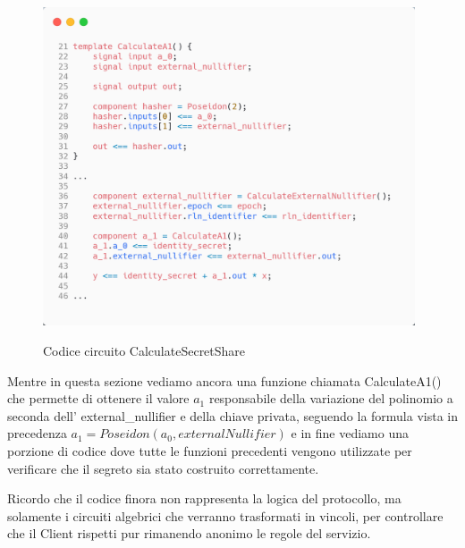 \begin{enumerate}
    \begin{figure}[H]
        \centering
        \includegraphics[width=11cm]{./chapters/3.poc/images/2.2.verify_shares.png}
        \label{fig:2.verify_shares}
        \captionsetup{justification=centering}
        \caption{Codice circuito CalculateSecretShare}
    \end{figure}
    Mentre in questa sezione vediamo ancora una funzione chiamata CalculateA1() che permette di ottenere il valore $a_1$
    responsabile della variazione del polinomio a seconda dell' external\_nullifier e della chiave privata, seguendo la
    formula vista in precedenza $a_1 = Poseidon(a_0, externalNullifier)$ e in fine vediamo una porzione di codice dove
    tutte le funzioni precedenti vengono utilizzate per verificare che il segreto sia stato costruito correttamente.
\end{enumerate}

Ricordo che il codice finora non rappresenta la logica del protocollo, ma solamente i circuiti algebrici che verranno
trasformati in vincoli, per controllare che il Client rispetti pur rimanendo anonimo le regole del servizio.

